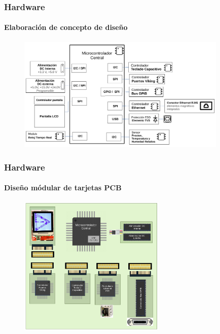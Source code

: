 \documentclass[xcolor=pdftext, table]{beamer}
\begin{document}
	\begin{frame}
		\frametitle{Hardware}
		\framesubtitle{Elaboración de concepto de diseño}
		
	
		\begin{figure}[h!]
			\includegraphics[width=10cm]{Imagenes/EsquemaCendit11713Detallado.pdf}		
		\end{figure}
	
	\end{frame}

	\begin{frame}
		\frametitle{Hardware}
		\framesubtitle{Diseño módular de tarjetas PCB}
		
		\begin{figure}[h!]
			\centering
			\includegraphics[width=7cm]{Imagenes/EsquemaCircuitoImpresoCendit11713_2.pdf}
		\end{figure}
	\end{frame}
\end{document}
